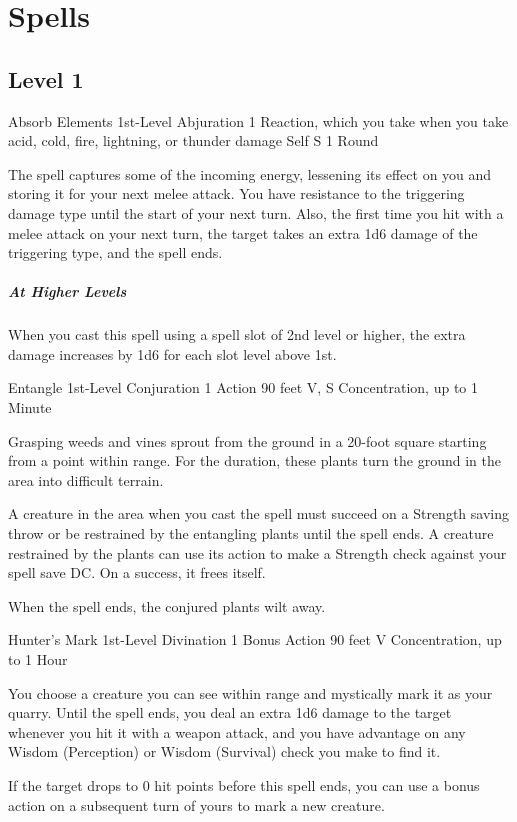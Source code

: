 {\section*{Spells}
\subsection*{Level 1}

\DndSpellHeader
  {Absorb Elements}
  {1st-Level Abjuration}
  {1 Reaction, which you take when you take acid, cold, fire, lightning, or thunder damage}
  {Self}
  {S}
  {1 Round}

The spell captures some of the incoming energy, lessening its effect on you and storing it for your next melee attack. You have resistance to the triggering damage type until the start of your next turn. Also, the first time you hit with a melee attack on your next turn, the target takes an extra 1d6 damage of the triggering type, and the spell ends.

\subparagraph*{At Higher Levels} When you cast this spell using a spell slot of 2nd level or higher, the extra damage increases by 1d6 for each slot level above 1st.

\DndSpellHeader
  {Entangle}
  {1st-Level Conjuration}
  {1 Action}
  {90 feet}
  {V, S}
  {Concentration, up to 1 Minute}

Grasping weeds and vines sprout from the ground in a 20-foot square starting from a point within range. For the duration, these plants turn the ground in the area into difficult terrain.

A creature in the area when you cast the spell must succeed on a Strength saving throw or be restrained by the entangling plants until the spell ends. A creature restrained by the plants can use its action to make a Strength check against your spell save DC. On a success, it frees itself.

When the spell ends, the conjured plants wilt away.

\DndSpellHeader
  {Hunter's Mark}
  {1st-Level Divination}
  {1 Bonus Action}
  {90 feet}
  {V}
  {Concentration, up to 1 Hour}

You choose a creature you can see within range and mystically mark it as your quarry. Until the spell ends, you deal an extra 1d6 damage to the target whenever you hit it with a weapon attack, and you have advantage on any Wisdom (Perception) or Wisdom (Survival) check you make to find it.

If the target drops to 0 hit points before this spell ends, you can use a bonus action on a subsequent turn of yours to mark a new creature.

}
